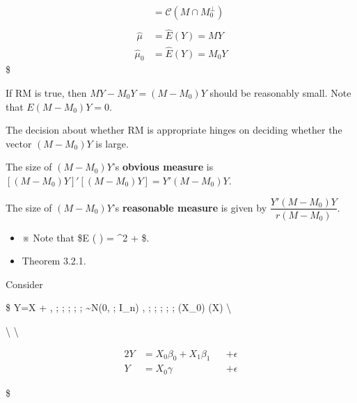 \documentclass[
]{book}
\providecommand{\tightlist}{%
  \setlength{\itemsep}{0pt}\setlength{\parskip}{0pt}}
\begin{document}
{{{\begin{align}
&= \mathcal{C}(M \cap M_0^\perp ) \\

\\\

\hat\mu &= \hat E(Y) = MY \tag{under FM}



\\

\hat\mu_0 &= \hat E(Y) = M_0 Y \tag{under RM}





\end{align}
\$

If RM is true, then \(MY-M_0 Y = (M - M_0)Y\) should be reasonably small. Note that \(E(M-M_0)Y = 0\).

The decision about whether RM is appropriate hinges on deciding whether the vector \((M - M_0)Y\) is large.

The size of \((M - M_0)Y\)'s \textbf{obvious measure} is \([(M - M_0)Y]'[(M - M_0)Y] = Y'(M-M_0)Y\).

The size of \((M - M_0)Y\)'s \textbf{reasonable measure} is given by \(\dfrac{Y'(M-M_0)Y}{r(M-M_0)}\).

\begin{itemize}
\tightlist
\item
  ※ Note that \$E \left(  \right) = \sigma\^{}2 +  \$.
\end{itemize}

\begin{itemize}
\tightlist
\item
  Theorem 3.2.1.
\end{itemize}

Consider

\$
Y=X \beta + \epsilon, ; ; ; ; ; \epsilon \sim N(0, ; I\_n) , ; ; ; ; ; (X\_0) \subset {}(X) \textbackslash{}

\textbackslash{}
\textbackslash{}

\begin{alignat}{2}


Y &= X_0 \beta_0 + X_1 \beta_1 &&+ \epsilon \tag{Full Model, FM}

\\


Y &= X_0 \gamma &&+ \epsilon \tag{Reduced Model, RM}

\end{alignat}

\$

}}}
\end{document}
